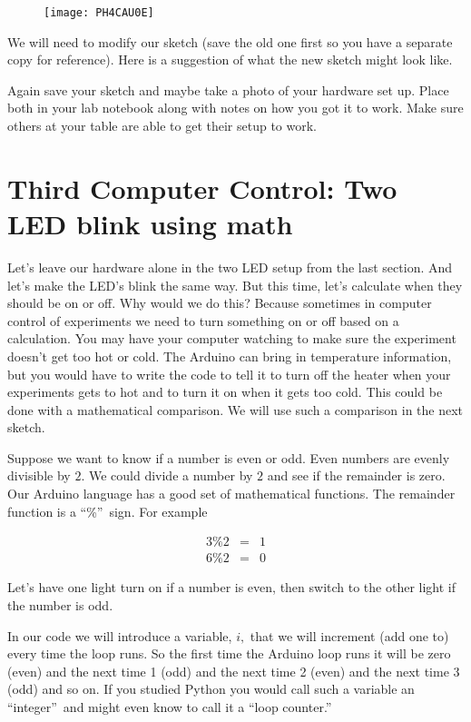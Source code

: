 \begin{figure}[h!]
\texttt{[image: PH4CAU0E]}
\end{figure}We will need to modify our sketch
(save the old one first so you have a separate copy for reference). Here is
a suggestion of what the new sketch might look like.




Again save your sketch and maybe take a photo of your hardware set up. Place
both in your lab notebook along with notes on how you got it to work. Make
sure others at your table are able to get their setup to work.

\section{Third Computer Control: Two LED blink using math}

Let's leave our hardware alone in the two LED setup from the last section.
And let's make the LED's blink the same way. But this time, let's calculate
when they should be on or off. Why would we do this? Because sometimes in
computer control of experiments we need to turn something on or off based on
a calculation. You may have your computer watching to make sure the
experiment doesn't get too hot or cold. The Arduino can bring in temperature
information, but you would have to write the code to tell it to turn off the
heater when your experiments gets to hot and to turn it on when it gets too
cold. This could be done with a mathematical comparison. We will use such a
comparison in the next sketch.

Suppose we want to know if a number is even or odd. Even numbers are evenly
divisible by $2.$ We could divide a number by $2$ and see if the remainder
is zero. Our Arduino language has a good set of mathematical functions. The
remainder function is a \textquotedblleft \%\textquotedblright\ sign. For
example 

\begin{eqnarray*}
	3\%2 &=&1 \\
	6\%2 &=&0
\end{eqnarray*}

Let's have one light turn on if a number is even, then switch to the other
light if the number is odd.

In our code we will introduce a variable, $i,$ that we will increment (add
one to) every time the loop runs. So the first time the Arduino loop runs it
will be zero (even) and the next time 1 (odd) and the next time 2 (even) and
the next time 3 (odd) and so on. If you studied Python you would call such a
variable an \textquotedblleft integer\textquotedblright\ and might even know
to call it a \textquotedblleft loop counter.\textquotedblright

